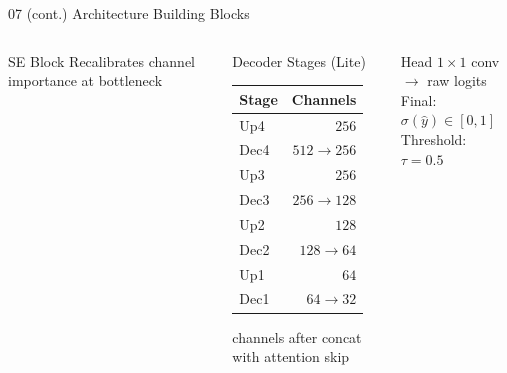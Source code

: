 ﻿\documentclass[aspectratio=169,t]{beamer}
\begin{document}
\begin{frame}{07 (cont.) Architecture Building Blocks}
\begin{columns}[t]
\begin{block}{SE Block}
\textcolor{textsecondary}{\tiny Recalibrates channel importance at bottleneck}
\end{block}
\begin{block}{Decoder Stages (Lite)}
\small
\begin{tabular}{lr}
Stage & Channels \\
\hline
Up4   & $256$ \\
Dec4  & $512 \to 256$ \\
Up3   & $256$ \\
Dec3  & $256 \to 128$ \\
Up2   & $128$ \\
Dec2  & $128 \to 64$ \\
Up1   & $64$  \\
Dec1  & $64 \to 32$  \\
\end{tabular}
\textcolor{textsecondary}{\tiny channels after concat with attention skip}
\end{block}
\vspace{0.15cm}
\begin{exampleblock}{Head}
\small $1\!\times\!1$ conv $\to$ raw logits\\
Final: $\sigma(\hat{y}) \in [0,1]$\\
Threshold: $\tau = 0.5$
\end{exampleblock}
\end{columns}
\end{frame}
\end{document}
